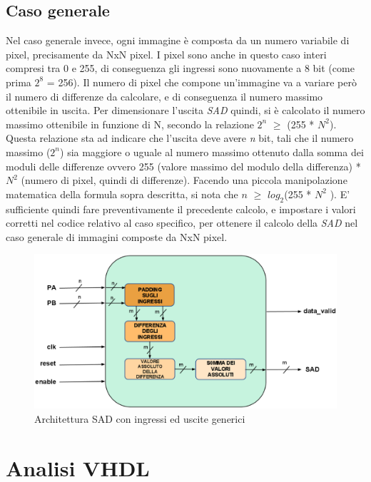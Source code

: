 \documentclass[12pt, a4paper]{article}
\begin{document}
\subsection{Caso generale}
Nel caso generale invece, ogni immagine è composta da un numero variabile di pixel, precisamente da NxN pixel. I pixel sono anche in questo caso interi compresi tra 0 e 255, di conseguenza gli ingressi sono nuovamente a 8 bit (come prima $2^8$ = 256). Il numero di pixel che compone un'immagine va a variare però il numero di differenze da calcolare, e di conseguenza il numero massimo ottenibile in uscita. Per dimensionare l'uscita \textit{SAD} quindi, si è calcolato il numero massimo ottenibile in funzione di N, secondo la relazione $2^n$ $\geq$ (255 * $N^2$). Questa relazione sta ad indicare che l'uscita deve avere \textit{n} bit, tali che il numero massimo ($2^n$) sia maggiore o uguale al numero massimo ottenuto dalla somma dei moduli delle differenze ovvero 255 (valore massimo del modulo della differenza) * $N^2$ (numero di pixel, quindi di differenze). Facendo una piccola manipolazione matematica della formula sopra descritta, si nota che $n$ $\geq$ $log_2$(255 * $N^2$ ). E' sufficiente quindi fare preventivamente il precedente calcolo, e impostare i valori corretti nel codice relativo al caso specifico, per ottenere il calcolo della \textit{SAD} nel caso generale di immagini composte da NxN pixel.
\begin{figure}[h!]
\centering
\includegraphics[scale=0.3]{images/sad_general_n.eps}
\caption{Architettura SAD con ingressi ed uscite generici}\label{fig:3}
\end{figure}
\newpage
\section{Analisi VHDL}
\end{document}
